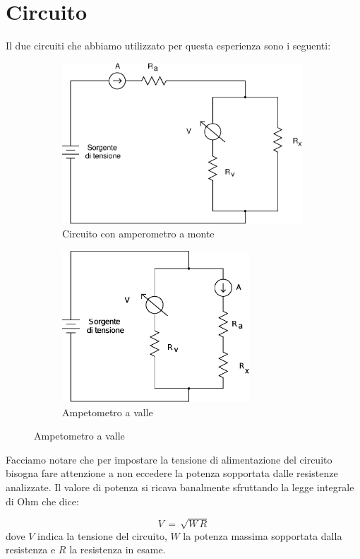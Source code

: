 \section*{Circuito}

Il due circuiti che abbiamo utilizzato per questa esperienza sono i seguenti:

\begin{figure}[h]
  \centering
  \begin{subfigure}[b]{0.50\textwidth}
    \includegraphics[width=9cm]{monte.eps}
    \caption{Circuito con amperometro a monte}
    \label{fig:monte}
  \end{subfigure}
  \qquad
  \begin{subfigure}[b]{0.40\textwidth}
    \includegraphics[width=7cm]{valle.eps}
    \caption{Ampetometro a valle}
    \label{fig:valle}
  \end{subfigure}
\end{figure}

Facciamo notare che per impostare la tensione di alimentazione del circuito bisogna fare attenzione a non eccedere la potenza sopportata dalle resistenze analizzate. Il valore di potenza si ricava banalmente sfruttando la legge integrale di Ohm che dice:

\begin{equation}
	V \,=\, \sqrt{W\,R}
\end{equation}
%
dove $V$ indica la tensione del circuito, $W$ la potenza massima sopportata dalla resistenza e $R$ la resistenza in esame.




